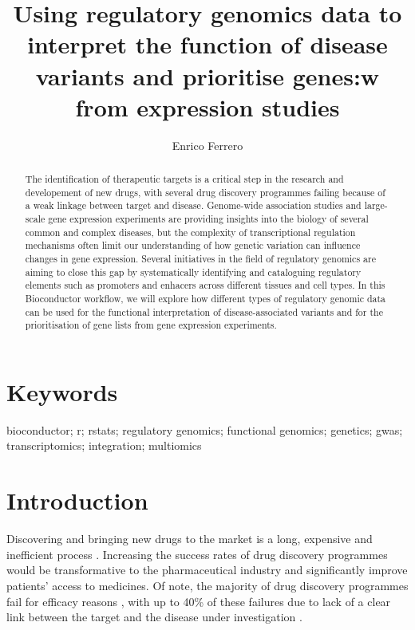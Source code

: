 \documentclass[9pt,a4paper,]{extarticle}
\begin{document}
\pagestyle{front}

\title{Using regulatory genomics data to interpret the function of disease variants and prioritise genes:w from expression studies}

\author{Enrico Ferrero}

\maketitle
\thispagestyle{front}

\begin{abstract}
The identification of therapeutic targets is a critical step in the research and developement of new drugs, with several drug discovery programmes failing because of a weak linkage between target and disease. Genome-wide association studies and large-scale gene expression experiments are providing insights into the biology of several common and complex diseases, but the complexity of transcriptional regulation mechanisms often limit our understanding of how genetic variation can influence changes in gene expression. Several initiatives in the field of regulatory genomics are aiming to close this gap by systematically identifying and cataloguing regulatory elements such as promoters and enhacers across different tissues and cell types. In this Bioconductor workflow, we will explore how different types of regulatory genomic data can be used for the functional interpretation of disease-associated variants and for the prioritisation of gene lists from gene expression experiments.
\end{abstract}

\section*{Keywords}
bioconductor; r; rstats; regulatory genomics; functional genomics; genetics; gwas; transcriptomics; integration; multiomics


\clearpage
\pagestyle{main}

\section{Introduction}\label{introduction}

Discovering and bringing new drugs to the market is a long, expensive and inefficient process \citep{Waring2015, DiMasi2016}.
Increasing the success rates of drug discovery programmes would be transformative to the pharmaceutical industry and significantly improve patients' access to medicines.
Of note, the majority of drug discovery programmes fail for efficacy reasons \citep{Harrison2016}, with up to 40\% of these failures due to lack of a clear link between the target and the disease under investigation \citep{Cook2014}.
\end{document}
